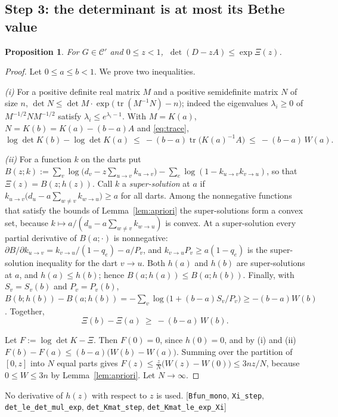 \documentclass[11pt]{amsart}
\theoremstyle{plain}
\newtheorem{proposition}[theorem]{Proposition}
\theoremstyle{remark}
\newcommand{\cC}{\mathcal{C}}
\newcommand{\code}[1]{\texttt{#1}}
\DeclareMathOperator{\tr}{tr}
\begin{document}
\subsection*{Step 3: the determinant is at most its Bethe value}
\begin{proposition}\label{prop:bethe}
For $G\in\cC'$ and $0\le z<1$, $\ \det(D-zA)\le\exp\Xi(z)$.
\end{proposition}
\begin{proof}
Let $0\le a\le b<1$. We prove two inequalities.

\smallskip\noindent\emph{(i)} For a positive definite real matrix $M$ and a positive semidefinite matrix $N$ of
size $n$, $\det N\le\det M\cdot\exp\bigl(\tr(M^{-1}N)-n\bigr)$; indeed the eigenvalues $\lambda_i\ge0$ of
$M^{-1/2}NM^{-1/2}$ satisfy $\lambda_i\le e^{\lambda_i-1}$. With $M=K(a)$, $N=K(b)=K(a)-(b-a)A$ and
\eqref{eq:trace},
\[
  \log\det K(b)-\log\det K(a)\ \le\ -(b-a)\tr\bigl(K(a)^{-1}A\bigr)\ \le\ -(b-a)\,W(a).
\]

\noindent\emph{(ii)} For a function $k$ on the darts put
$B(z;k):=\sum_v\log\bigl(d_v-z\sum_{u\to v}k_{u\to v}\bigr)-\sum_e\log(1-k_{u\to v}k_{v\to u})$, so that
$\Xi(z)=B(z;h(z))$. Call $k$ a \emph{super-solution} at $a$ if
$k_{u\to v}\bigl(d_u-a\sum_{w\ne v}k_{w\to u}\bigr)\ge a$ for all darts. Among the nonnegative functions that
satisfy the bounds of Lemma~\ref{lem:apriori} the super-solutions form a convex set, because
$k\mapsto a/(d_u-a\sum_{w\ne v}k_{w\to u})$ is convex. At a super-solution every partial derivative of
$B(a;\cdot)$ is nonnegative:
$\partial B/\partial k_{u\to v}=k_{v\to u}/(1-q_e)-a/P_v$, and $k_{v\to u}P_v\ge a(1-q_e)$ is the super-solution
inequality for the dart $v\to u$. Both $h(a)$ and $h(b)$ are super-solutions at $a$, and $h(a)\le h(b)$; hence
$B(a;h(a))\le B(a;h(b))$. Finally, with $S_v=S_v(b)$ and $P_v=P_v(b)$,
$B(b;h(b))-B(a;h(b))=-\sum_v\log\bigl(1+(b-a)S_v/P_v\bigr)\ge-(b-a)W(b)$. Together,
\[
  \Xi(b)-\Xi(a)\ \ge\ -(b-a)\,W(b).
\]

\noindent Let $F:=\log\det K-\Xi$. Then $F(0)=0$, since $h(0)=0$, and by (i) and (ii)
$F(b)-F(a)\le(b-a)\bigl(W(b)-W(a)\bigr)$. Summing over the partition of $[0,z]$ into $N$ equal parts gives
$F(z)\le\frac zN\bigl(W(z)-W(0)\bigr)\le3nz/N$, because $0\le W\le3n$ by Lemma~\ref{lem:apriori}. Let $N\to\infty$.
\end{proof}
\noindent No derivative of $h(z)$ with respect to $z$ is used. [\code{Bfun\_mono}, \code{Xi\_step},
\code{det\_le\_det\_mul\_exp}, \code{det\_Kmat\_step}, \code{det\_Kmat\_le\_exp\_Xi}]
\end{document}
